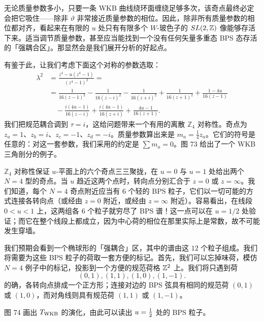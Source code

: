 无论质量参数多小，只要一条 WKB 曲线绕环面缠绕足够多次，该奇点最终必定会把它吸住——除非 $\vartheta$ 非常接近质量参数的相位。因此，除非所有质量参数的相位都对齐，看起来在有限的 $u$ 处只有有限多个 $W$-玻色子的 $SL(2,\mathbb{Z})$ 像能够存活下来。适当调节质量参数，甚至应当能找到一个没有任何矢量多重态 BPS 态存活的「强耦合区」。那显然会是我们展开分析的好起点。

有鉴于此，让我们考虑下面这个对称的参数选取：
\begin{equation}
\begin{split}
\lambda^2 &= \frac{z^4-u(z^4-1)}{(z^4-1)^2} = \\
&= \frac{1}{16 (z-1)^2}-\frac{1}{16 (z-i)^2}-\frac{1}{16 (z+i)^2}+\frac{1}{16 (z+1)^2}+\frac{1-4 u}{16 (z-1)}\\
&\quad -\frac{i (4 u-1)}{16 (z-i)}+\frac{i (4 u-1)}{16 (z+i)}+\frac{4 u-1}{16 (z+1)}.
\end{split}
\end{equation}
我们把规范耦合调到 $\tau=i$，这给问题带来一个有用的离散 ${\mathbb Z}_4$ 对称性。奇点为 $z_a = 1$、$z_b = i$、$z_c = -1$、$z_d = -i$。质量参数算出来是 $m_a = \frac{1}{4} z_a$。它们的符号是任意的：对这一套参数，我们采用的约定是 $\sum m_a=0$。图 73 给出了一个 WKB 三角剖分的例子。

${\mathbb Z}_4$ 对称性保证 $u$-平面上的六个奇点三三聚拢，在 $u=0$ 与 $u=1$ 处给出两个 $N=4$ 型的奇点。当 $u$ 趋近这两个点时，转向点分别汇合于 $z=0$ 或 $z=\infty$。我们知道，每个 $N=4$ 奇点附近应当有 $6$ 个轻的 BPS 粒子，它们以一切可能的方式连接各转向点（或经由 $z=0$ 附近，或经由 $z=\infty$ 附近）。容易看出，在线段 $0<u<1$ 上，这两组各 $6$ 个粒子就穷尽了 BPS 谱！这一点可以在 $u=1/2$ 处验证；而它在整个线段上都成立，因为中心荷的相位在那里实际上是常数，故不可能发生穿墙。

我们预期会看到一个椭球形的「强耦合」区，其中的谱由这 $12$ 个粒子组成。我们将需要为这些 BPS 粒子的荷取一套方便的标记。首先，我们可以忘掉味荷，模仿 $N=4$ 例子中的标记，投影到一个方便的规范荷格 $\mathbb{Z}^2$ 上。我们将只遇到荷
\begin{equation}(0,1), (1,1), (1,0), (1,-1). \end{equation}
的确，各转向点排成一个正方形；连接对边的 BPS 弦具有相同的规范荷 $(0,1)$ 或 $(1,0)$，而对角线则具有规范荷 $(1,1)$ 或 $(1,-1)$。

图 74 画出 $T_{\rm WKB}$ 的演化，由此可以读出 $u = \tfrac{1}{2}$ 处的 BPS 粒子。


